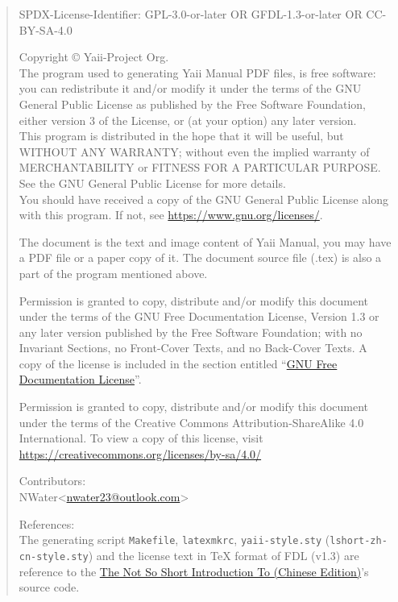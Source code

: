 \newpage\thispagestyle{empty}
\begin{quote}\footnotesize
SPDX-License-Identifier: GPL-3.0-or-later OR GFDL-1.3-or-later OR CC-BY-SA-4.0

Copyright \copyright{} {\the\year} Yaii-Project Org. \\
The program used to generating Yaii Manual PDF files, is free software: you can redistribute it and/or modify it under the terms of the GNU General Public License as published by the Free Software Foundation, either version 3 of the License, or (at your option) any later version. \\
This program is distributed in the hope that it will be useful, but WITHOUT ANY WARRANTY; without even the implied warranty of MERCHANTABILITY or FITNESS FOR A PARTICULAR PURPOSE. See the GNU General Public License for more details. \\
You should have received a copy of the GNU General Public License along with this program. If not, see \url{https://www.gnu.org/licenses/}.

The document is the text and image content of Yaii Manual, you may have a PDF file or a paper copy of it. The document source file (.tex) is also a part of the program mentioned above.

Permission is granted to copy, distribute and/or modify this document
under the terms of the GNU Free Documentation License, Version 1.3
or any later version published by the Free Software Foundation;
with no Invariant Sections, no Front-Cover Texts, and no Back-Cover Texts.
A copy of the license is included in the section entitled ``\hyperref[label_fdl]{GNU
Free Documentation License}''.

Permission is granted to copy, distribute and/or modify this document
under the terms of the Creative Commons Attribution-ShareAlike 4.0 International. To view a copy of this license, visit \url{https://creativecommons.org/licenses/by-sa/4.0/}

Contributors: \\
NWater<\href{mailto:nwater23@outlook.com}{nwater23@outlook.com}>

References: \\
The generating script \verb|Makefile|, \verb|latexmkrc|, \verb|yaii-style.sty| (\verb|lshort-zh-cn-style.sty|) and the license text in \TeX{} format of FDL (v1.3) are reference to the \href{https://ctan.org/pkg/lshort-zh-cn}{The Not So Short Introduction To \LaTeXe (Chinese Edition)}'s source code.

\end{quote}
\endinput
